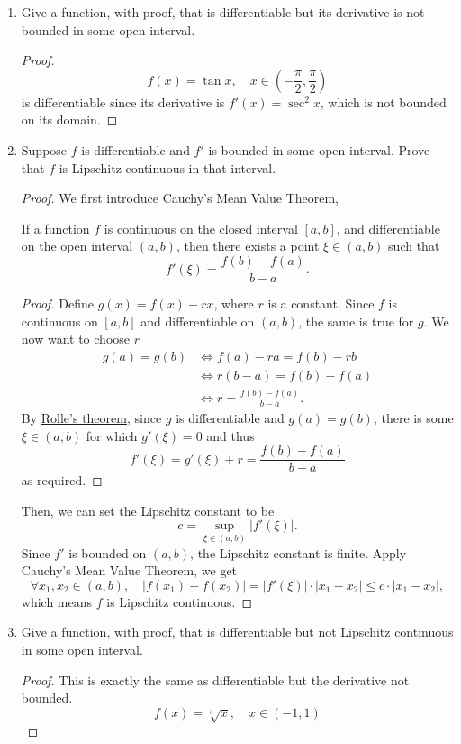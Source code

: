 \begin{enumerate}
	\item Give a function, with proof, that is differentiable but its derivative is not bounded in some open interval.
	\begin{proof}
	\[ f(x)=\tan x, \quad x\in\left(-\frac{\pi}{2},\frac{\pi}{2}\right) \]
	is differentiable since its derivative is \(f'(x)=\sec^2x\), which is not bounded on its domain.
	\end{proof}
	\item Suppose $f$ is differentiable and $f'$ is bounded in some open interval.
	Prove that $f$ is Lipschitz continuous in that interval.
	\begin{proof}
	We first introduce Cauchy's Mean Value Theorem,
	\begin{theorem}
	\label{cauchymean}
	If a function $f$ is continuous on the closed interval \([a,b]\), and differentiable on the open interval \((a,b)\), then there exists a point \(\xi\in(a,b)\) such that
	\[ f'(\xi)=\frac{f(b)-f(a)}{b-a}. \]
	\end{theorem}
	\begin{proof}
	Define \(g(x)=f(x)-rx\), where $r$ is a constant.
	Since $f$ is continuous on \([a,b]\) and {}differentiable on \((a,b)\), the same is true for $g$.
	We now want to choose $r$
	\begin{align*}
	g(a)=g(b)&\iff f(a)-ra=f(b)-rb\\
	&\iff r(b-a)=f(b)-f(a) \\
	&\iff r=\frac{f(b)-f(a)}{b-a}.
	\end{align*}
	By \hyperref[rolle]{Rolle's theorem}, since $g$ is differentiable and \(g(a)=g(b)\), there is some \(\xi\in(a,b)\) for which \(g'(\xi)=0\) and thus
	\[ f'(\xi)=g'(\xi)+r=\frac{f(b)-f(a)}{b-a}\]
	as required.
	\end{proof}
	Then, we can set the Lipschitz constant to be
	\[ c=\sup_{\xi\in(a,b)}|f'(\xi)|. \]
	Since $f'$ is bounded on \((a,b)\), the Lipschitz constant is finite.
	Apply Cauchy's Mean Value Theorem, we get
	\[ \forall x_1,x_2\in(a,b),\quad |f(x_1)-f(x_2)|=|f'(\xi)|\cdot|x_1-x_2|\leq c\cdot|x_1-x_2|, \]
	which means $f$ is Lipschitz continuous.
	\end{proof}
	\item Give a function, with proof, that is differentiable but not Lipschitz continuous in some open interval.
	\begin{proof}
	This is exactly the same as differentiable but the derivative not bounded.	
	\[ f(x)=\sqrt[3]{x}, \quad x\in(-1,1) \]

\end{proof}
\end{enumerate}
